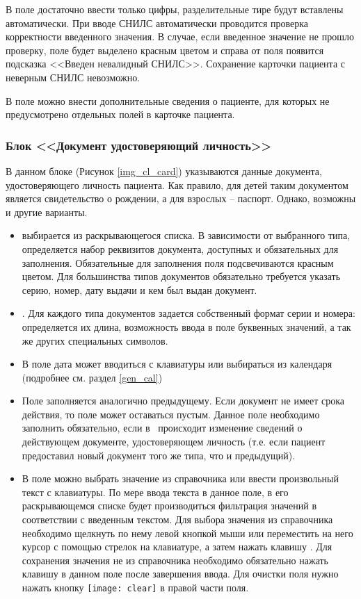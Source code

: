 {В поле  достаточно ввести только цифры, разделительные тире будут вставлены автоматически. При вводе СНИЛС автоматически проводится проверка корректности введенного значения. В случае, если введенное значение не прошло проверку, поле будет выделено красным цветом и справа от поля появится подсказка <<Введен невалидный СНИЛС>>. Сохранение карточки пациента с неверным СНИЛС невозможно.

В поле  можно внести дополнительные сведения о пациенте, для которых не предусмотрено отдельных полей в карточке пациента. 
 
\subsubsection{Блок <<Документ удостоверяющий личность>>}

В данном блоке (Рисунок \ref{img_cl_card}) указываются данные документа, удостоверяющего личность пациента. Как правило, для детей таким документом является свидетельство о рождении, а для взрослых – паспорт. Однако, возможны и другие варианты. 
\begin{itemize}
 \item {} выбирается из раскрывающегося списка. В зависимости от выбранного типа, определяется набор реквизитов документа, доступных и обязательных для  заполнения. Обязательные для заполнения поля подсвечиваются красным цветом. Для большинства типов документов обязательно требуется указать серию, номер, дату выдачи и кем был выдан документ. 
 \item {}. Для каждого типа документов задается собственный формат серии и номера: определяется их длина,  возможность ввода в поле буквенных значений, а так же других специальных символов. 
 \item В поле  дата может вводиться с клавиатуры или выбираться из календаря (подробнее см. раздел \ref{gen_cal}) 
 \item Поле  заполняется аналогично предыдущему. Если документ не имеет срока действия, то поле может оставаться пустым. Данное поле необходимо заполнить обязательно, если в \tmis~происходит изменение сведений о действующем документе, удостоверяющем личность (т.е. если пациент предоставил новый документ того же типа, что и предыдущий). 
 \item В поле  можно выбрать значение из справочника или ввести произвольный текст с клавиатуры. По мере ввода текста в данное поле, в его  раскрывающемся списке будет производиться фильтрация значений в соответствии с введенным текстом. Для выбора значения из справочника необходимо щелкнуть по нему левой кнопкой мыши или переместить на него курсор с помощью стрелок на клавиатуре, а затем нажать клавишу . Для сохранения значения не из справочника необходимо обязательно нажать клавишу  в данном поле после завершения ввода. Для очистки поля нужно нажать кнопку \texttt{[image: clear]} в правой части поля.
\end{itemize}

}
